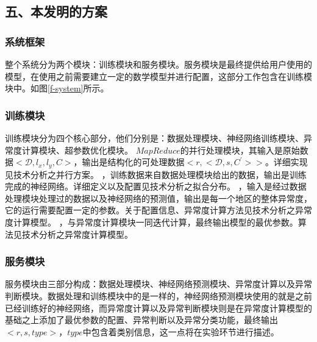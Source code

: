 \documentclass[a4paper, UTF8]{article}
\begin{document}
\begin{CJK}{UTF8}{gbsn}
\begin{appendix}
\subsection*{五、本发明的方案}
\subsubsection*{系统框架}
整个系统分为两个模块：训练模块和服务模块。服务模块是最终提供给用户使用的模型，在使用之前需要建立一定的数学模型并进行配置，这部分工作包含在训练模块中。如图\ref{f-system}所示。
\subsubsection*{训练模块}
训练模块分为四个核心部分，他们分别是：数据处理模块、神经网络训练模块、异常度计算模块、超参数优化模块。
$MapReduce$的并行处理模块，其输入是原始数据$<\mathcal{D},l_x,l_y,C>$，输出是结构化的可处理数据$<r,<\mathcal{D},s,C^{'}>>$。详细实现见技术分析之并行方案。
，训练数据来自数据处理模块给出的数据，输出是训练完成的神经网络。详细定义以及配置见技术分析之拟合分布。
，输入是经过数据处理模块处理过的数据以及神经网络的预测值，输出是每一个地区的整体异常度，它的运行需要配置一定的参数。关于配置信息、异常度计算方法见技术分析之异常度计算模型。
，与异常度计算模块一同迭代计算，最终输出模型的最优参数。算法见技术分析之异常度计算模型。
\subsubsection*{服务模块}
服务模块由三部分构成：数据处理模块、神经网络预测模块、异常度计算以及异常判断模块。数据处理和训练模块中的是一样的，神经网络预测模块使用的就是之前已经训练好的神经网络，而异常度计算以及异常判断模块则是在异常度计算模型的基础之上添加了最优参数的配置、异常判断以及异常分类功能，最终输出$<r,s,type>$，$type$中包含着类别信息，这一点将在实验环节进行描述。

\end{appendix}
\end{CJK}
\end{document}
